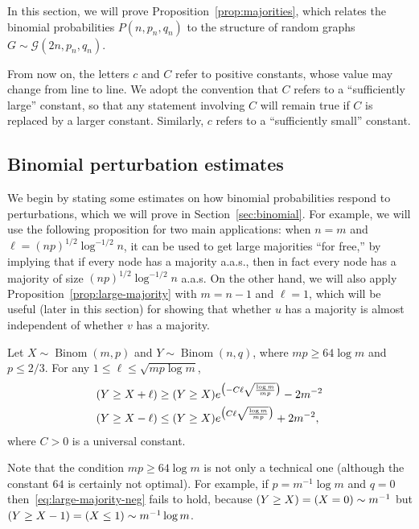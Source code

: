 \documentclass[EJP]{ejpecp}
\newcommand{\1}[1]{\mathbbm{1}_{\{#1\}}}
\newcommand{\calG}{\mathcal{G}}
\let\Pr\relax
\DeclareMathOperator{\Pr}{Pr}
\DeclareMathOperator{\Binom}{Binom}
\begin{document}
In this section, we will prove Proposition~\ref{prop:majorities}, which relates
the binomial probabilities $P(n, p_n, q_n)$ to the structure of
random graphs $G \sim \calG(2n, p_n, q_n)$.

From now on, the letters $c$ and $C$ refer to positive
constants, whose value may change from line to line. We adopt the convention
that $C$ refers to a ``sufficiently large'' constant, so that any statement
involving $C$ will remain true if $C$ is replaced by a larger constant.
Similarly, $c$ refers to a ``sufficiently small'' constant.

\subsection{Binomial perturbation estimates}
We begin by stating some estimates on how binomial probabilities
respond to perturbations, which we will prove in Section~\ref{sec:binomial}.
For example, we will use the following proposition for two
main applications: when $n = m$ and
$\ell = (np)^{1/2} \log^{-1/2} n$, it can be used to
get large majorities ``for free,'' by implying that if
every node has a majority a.a.s., then in fact every node has
a majority of size $(np)^{1/2} \log^{-1/2} n$ a.a.s.
On the other hand, we will also apply Proposition~\ref{prop:large-majority}
with $m = n-1$ and $\ell = 1$, which will be useful (later in this section)
for showing that whether $u$
has a majority is almost independent of whether $v$ has a majority.

\begin{proposition}\label{prop:large-majority}
 Let $X \sim \Binom(m, p)$ and $Y \sim \Binom(n, q)$,
 where $mp \ge 64 \log m$ and $p \le 2/3$. For any $1 \le \ell \le \sqrt{mp \log m}$,
 \begin{align}
  \Pr(Y \ge X + \ell) &\ge
   \Pr(Y \ge X) e^{\big( -C \ell \sqrt{\frac{\log m}{mp}}\big)} - 2m^{-2}
  \label{eq:large-majority-pos} \\
  \Pr(Y \ge X - \ell) &\le
  \Pr(Y \ge X)
  e^{\big(
    C \ell \sqrt{\frac{\log m}{mp}}\big)
  } + 2m^{-2},\label{eq:large-majority-neg}
 \end{align}
 where $C > 0$ is a universal constant.
\end{proposition}

Note that the condition $mp \ge 64 \log m$ is not only a technical one
(although the constant $64$ is certainly not optimal).
For example, if $p = m^{-1} \log m$ and $q = 0$
then~\eqref{eq:large-majority-neg} fails to hold, because
$\Pr(Y \ge X) = \Pr(X = 0) \sim m^{-1}$ but
$\Pr(Y \ge X - 1) = \Pr(X \le 1) \sim m^{-1} \log m$.
\end{document}
